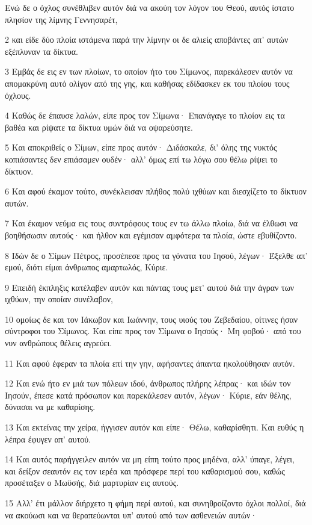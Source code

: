 \par Ενώ δε ο όχλος συνέθλιβεν αυτόν διά να ακούη τον λόγον του Θεού, αυτός ίστατο πλησίον της λίμνης Γεννησαρέτ,
\par 2 και είδε δύο πλοία ιστάμενα παρά την λίμνην οι δε αλιείς αποβάντες απ' αυτών εξέπλυναν τα δίκτυα.
\par 3 Εμβάς δε εις εν των πλοίων, το οποίον ήτο του Σίμωνος, παρεκάλεσεν αυτόν να απομακρύνη αυτό ολίγον από της γης, και καθήσας εδίδασκεν εκ του πλοίου τους όχλους.
\par 4 Καθώς δε έπαυσε λαλών, είπε προς τον Σίμωνα· Επανάγαγε το πλοίον εις τα βαθέα και ρίψατε τα δίκτυα υμών διά να οψαρεύσητε.
\par 5 Και αποκριθείς ο Σίμων, είπε προς αυτόν· Διδάσκαλε, δι' όλης της νυκτός κοπιάσαντες δεν επιάσαμεν ουδέν· αλλ' όμως επί τω λόγω σου θέλω ρίψει το δίκτυον.
\par 6 Και αφού έκαμον τούτο, συνέκλεισαν πλήθος πολύ ιχθύων και διεσχίζετο το δίκτυον αυτών.
\par 7 Και έκαμον νεύμα εις τους συντρόφους τους εν τω άλλω πλοίω, διά να έλθωσι να βοηθήσωσιν αυτούς· και ήλθον και εγέμισαν αμφότερα τα πλοία, ώστε εβυθίζοντο.
\par 8 Ιδών δε ο Σίμων Πέτρος, προσέπεσε προς τα γόνατα του Ιησού, λέγων· Έξελθε απ' εμού, διότι είμαι άνθρωπος αμαρτωλός, Κύριε.
\par 9 Επειδή έκπληξις κατέλαβεν αυτόν και πάντας τους μετ' αυτού διά την άγραν των ιχθύων, την οποίαν συνέλαβον,
\par 10 ομοίως δε και τον Ιάκωβον και Ιωάννην, τους υιούς του Ζεβεδαίου, οίτινες ήσαν σύντροφοι του Σίμωνος. Και είπε προς τον Σίμωνα ο Ιησούς· Μη φοβού· από του νυν ανθρώπους θέλεις αγρεύει.
\par 11 Και αφού έφεραν τα πλοία επί την γην, αφήσαντες άπαντα ηκολούθησαν αυτόν.
\par 12 Και ενώ ήτο εν μιά των πόλεων ιδού, άνθρωπος πλήρης λέπρας· και ιδών τον Ιησούν, έπεσε κατά πρόσωπον και παρεκάλεσεν αυτόν, λέγων· Κύριε, εάν θέλης, δύνασαι να με καθαρίσης.
\par 13 Και εκτείνας την χείρα, ήγγισεν αυτόν και είπε· Θέλω, καθαρίσθητι. Και ευθύς η λέπρα έφυγεν απ' αυτού.
\par 14 Και αυτός παρήγγειλεν αυτόν να μη είπη τούτο προς μηδένα, αλλ' ύπαγε, λέγει, και δείξον σεαυτόν εις τον ιερέα και πρόσφερε περί του καθαρισμού σου, καθώς προσέταξεν ο Μωϋσής, διά μαρτυρίαν εις αυτούς.
\par 15 Αλλ' έτι μάλλον διήρχετο η φήμη περί αυτού, και συνηθροίζοντο όχλοι πολλοί, διά να ακούωσι και να θεραπεύωνται υπ' αυτού από των ασθενειών αυτών·
